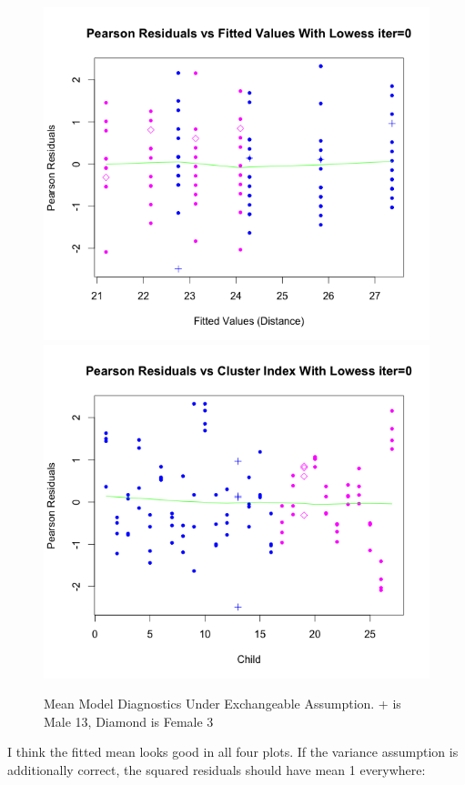 \documentclass[11pt]{article}
\begin{document}
\begin{enumerate}
		\begin{figure}[H]
			\includegraphics[scale=0.4]{RplotExchMean1}
			\includegraphics[scale=0.4]{RplotExchMean2}	
			\caption{Mean Model Diagnostics Under Exchangeable Assumption. + is Male 13, Diamond is Female 3}
		\end{figure}
		I think the fitted mean looks good in all four plots. If the variance assumption is additionally correct, the squared residuals should have mean 1 everywhere:
		\begin{figure}[H]

\end{figure}
\end{enumerate}
\end{document}
